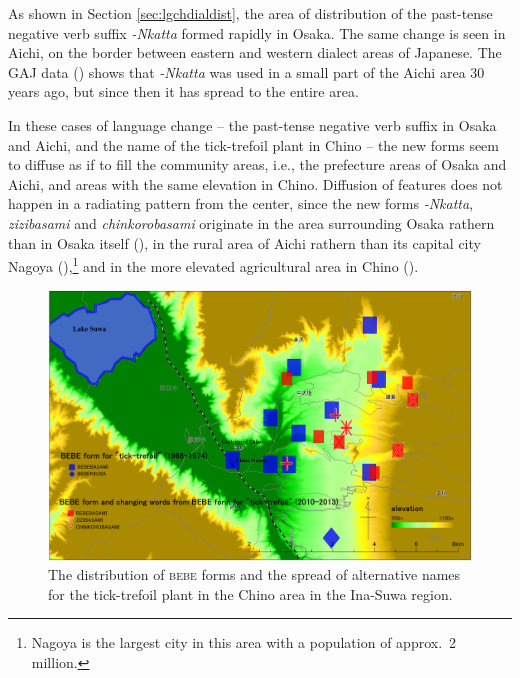 \documentclass[output=paper]{LSP/langsci}
\begin{document}
As shown in Section \ref{sec:lgchdialdist}, the area of distribution of the past-tense negative verb suffix \textit{-Nkatta} formed rapidly in Osaka. The same change is seen in Aichi, on the border between eastern and western dialect areas of Japanese. The GAJ data () shows that \textit{-Nkatta} was used in a small part of the Aichi area 30 years ago, but since then it has spread to the entire area.

In these cases of language change -- the past-tense negative verb suffix in Osaka and Aichi, and the name of the tick-trefoil plant in Chino -- the new forms seem to diffuse as if to fill the community areas, i.e., the prefecture areas of Osaka and Aichi, and areas with the same elevation in Chino. Diffusion of features does not happen in a radiating pattern from the center, since the new forms \textit{-Nkatta}, \textit{zizibasami} and \textit{chinkorobasami} originate in the area surrounding Osaka rathern than in Osaka itself (), in the rural area of Aichi rathern than its capital city Nagoya (),\footnote{ Nagoya is the largest city in this area with a population of approx.\ 2 million.} and in the more elevated agricultural area in Chino ().


\begin{figure}
\includegraphics[width=\textwidth]{illustrations/onishi_fig5}
\caption{The distribution of \textsc{bebe} forms and the spread of alternative names for the tick-trefoil plant in the Chino area in the Ina-Suwa region.}
\label{fig:5}
\end{figure}
\end{document}
